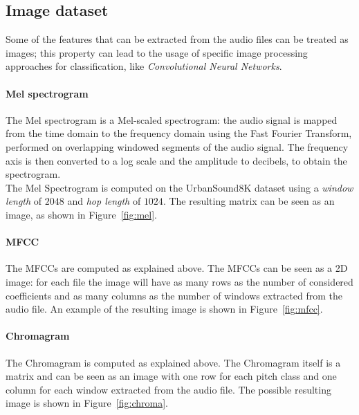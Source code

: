 \documentclass[oneside,openany]{article}
\begin{document}
    \subsection{Image dataset}
    \label{subsection:img_dataset}
    Some of the features that can be extracted from the audio files can be treated as images; this property can lead to the usage of specific image processing approaches for classification, like \textit{Convolutional Neural Networks}. 
    
    \paragraph{Mel spectrogram} 
    The Mel spectrogram is a Mel-scaled spectrogram: the audio signal is mapped from the time domain to the frequency domain using the Fast Fourier Transform, performed on overlapping windowed segments of the audio signal. The frequency axis is then converted to a log scale and the amplitude to decibels, to obtain the spectrogram.\\ 
    The Mel Spectrogram is computed on the UrbanSound8K dataset using a \textit{window length} of $2048$ and \textit{hop length} of $1024$. The resulting matrix can be seen as an image, as shown in Figure~\ref{fig:mel}.

    \paragraph{MFCC}
    The MFCCs are computed as explained above. The MFCCs can be seen as a 2D image: for each file the image will have as many rows as the number of considered coefficients and as many columns as the number of windows extracted from the audio file. An example of the resulting image is shown in Figure~\ref{fig:mfcc}.
    
    \paragraph{Chromagram}
    The Chromagram is computed as explained above. The Chromagram itself is a matrix and can be seen as an image with one row for each pitch class and one column for each window extracted from the audio file. The possible resulting image is shown in Figure~\ref{fig:chroma}.
\end{document}
